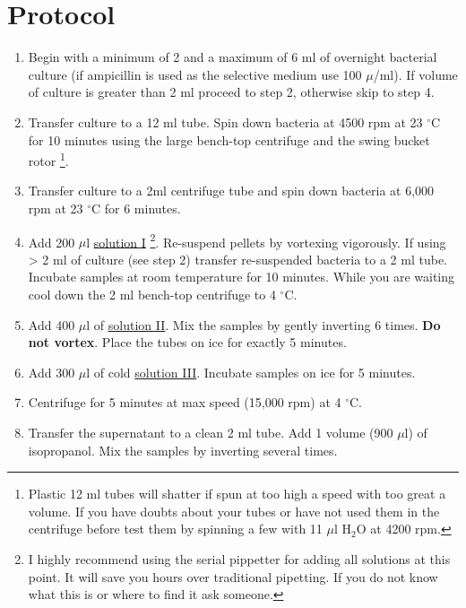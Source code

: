 \documentclass[12pt]{article}
\theoremstyle{definition}
\begin{document}
\pagebreak

\section*{Protocol}


\begin{enumerate}
	\item Begin with a minimum of 2 and a maximum of 6 ml of overnight bacterial culture (if ampicillin is used as the selective medium use 100 $\mu$/ml). If volume of culture is greater than 2 ml proceed to step 2, otherwise skip to step 4.
	
	\item Transfer culture to a 12 ml tube. Spin down bacteria at 4500 rpm at 23 $^{\circ}$C for 10 minutes using the large bench-top centrifuge and the swing bucket rotor \footnote{Plastic 12 ml tubes will shatter if spun at too high a speed with too great a volume. If you have doubts about your tubes or have not used them in the centrifuge before test them by spinning a few with 11 $\mu$l H$_{2}$O at 4200 rpm.}.
	
	\item Transfer culture to a 2ml centrifuge tube and spin down bacteria at 6,000 rpm at 23 $^{\circ}$C for 6 minutes.
	
	\item Add 200 $\mu$l \hyperref[sec:sol-1]{solution I} \footnote{I highly recommend using the serial pippetter for adding all solutions at this point. It will save you hours over traditional pipetting. If you do not know what this is or where to find it ask someone.}. 
	Re-suspend pellets by vortexing vigorously. If using > 2 ml of culture (see step 2) transfer
	re-suspended bacteria to a 2 ml tube. Incubate samples at room temperature for 10 minutes. While you are waiting cool down the 2 ml bench-top centrifuge to 4  $^{\circ}$C.
	
	\item Add 400 $\mu$l of \hyperref[sec:sol-2]{solution II}. Mix the samples by gently
	inverting 6 times. \textbf{Do not vortex}. Place the tubes on ice for exactly 5 minutes.
	
	\item Add 300 $\mu$l of cold \hyperref[sec:sol-3]{solution III}. Incubate samples on ice for 5 minutes.
	
	\item Centrifuge for 5 minutes at max speed (15,000 rpm) at 4  $^{\circ}$C.
	
	\item Transfer the supernatant to a clean 2 ml tube. Add 1 volume (900 $\mu$l) of isopropanol. Mix the samples by inverting several times.
	

\end{enumerate}
\end{document}
